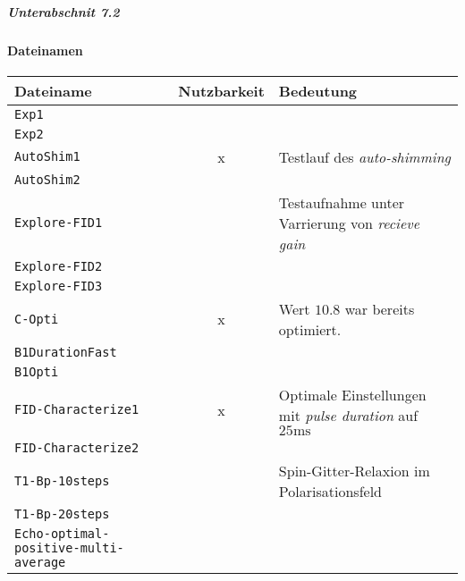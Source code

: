 \documentclass{subfiles}
\begin{document}
            \subparagraph*{Unterabschnit 7.2}
            

        \paragraph*{Dateinamen}

        \begin{table}[H]
            \centering
            \begin{tabular}{p{4cm}|c|p{6cm}}
                \textbf{Dateiname} & \textbf{Nutzbarkeit} & \textbf{Bedeutung} \\
                \hline\hline
                \texttt{Exp1} & & \\
                \texttt{Exp2} & & \\
                \hline
                \texttt{AutoShim1} & x & Testlauf des \emph{auto-shimming} \\
                \texttt{AutoShim2} & & \\
                \hline
                \texttt{Explore-FID1} & & Testaufnahme unter Varrierung von \emph{recieve gain} \\
                \texttt{Explore-FID2} & & \\
                \texttt{Explore-FID3} & & \\
                \hline
                \texttt{C-Opti} & x & Wert $10.8$ war bereits optimiert. \\
                \hline
                \texttt{B1DurationFast} & & \\
                \texttt{B1Opti} & & \\
                \hline
                \texttt{FID-Characterize1} & x & Optimale Einstellungen mit \emph{pulse duration} auf $25\si{\ms}$\\
                \texttt{FID-Characterize2} & & \\
                \hline
                \texttt{T1-Bp-10steps} & & Spin-Gitter-Relaxion im Polarisationsfeld \\
                \texttt{T1-Bp-20steps} & & \\
                \hline
                \texttt{Echo-optimal-}\texttt{positive-multi-average} & & \\
            \end{tabular}
        \end{table}
\end{document}
